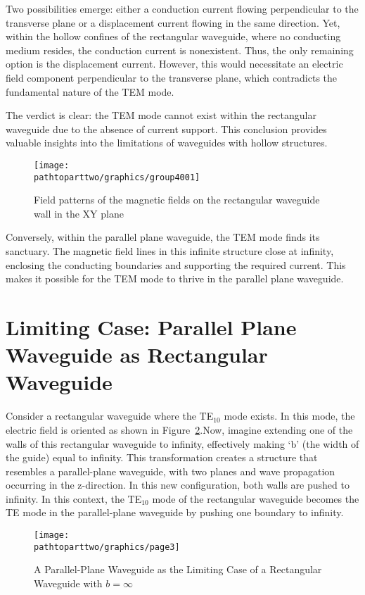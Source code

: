 Two possibilities emerge: either a conduction current flowing perpendicular to the transverse plane or a displacement current flowing in the same direction. Yet, within the hollow confines of the rectangular waveguide, where no conducting medium resides, the conduction current is nonexistent. Thus, the only remaining option is the displacement current. However, this would necessitate an electric field component perpendicular to the transverse plane, which contradicts the fundamental nature of the TEM mode.

The verdict is clear: the TEM mode cannot exist within the rectangular waveguide due to the absence of current support. This conclusion provides valuable insights into the limitations of waveguides with hollow structures.
\begin{figure}[h]
\centering
\texttt{[image: \\pathtoparttwo/graphics/group4001]}
\caption{Field patterns of the magnetic fields on the rectangular waveguide wall in the XY plane}
\label{fig:group4001}
\end{figure}

Conversely, within the parallel plane waveguide, the TEM mode finds its sanctuary. The magnetic field lines in this infinite structure close at infinity, enclosing the conducting boundaries and supporting the required current. This makes it possible for the TEM mode to thrive in the parallel plane waveguide.

\section{Limiting Case: Parallel Plane Waveguide as Rectangular Waveguide}
Consider a rectangular waveguide where the TE$_{10}$ mode exists. In this mode, the electric field is oriented as shown in Figure~\ref{fig:page3}.Now, imagine extending one of the walls of this rectangular waveguide to infinity, effectively making `b' (the width of the guide) equal to infinity. This transformation creates a structure that resembles a parallel-plane waveguide, with two planes and wave propagation occurring in the z-direction. In this new configuration, both walls are pushed to infinity. In this context, the TE$_{10}$ mode of the rectangular waveguide becomes the TE mode in the parallel-plane waveguide by pushing one boundary to infinity.
\begin{figure}[h]
\centering
\texttt{[image: \\pathtoparttwo/graphics/page3]}
\caption{A Parallel-Plane Waveguide as the Limiting Case of a Rectangular Waveguide with $b=\infty$}
\label{fig:page3}
\end{figure}

